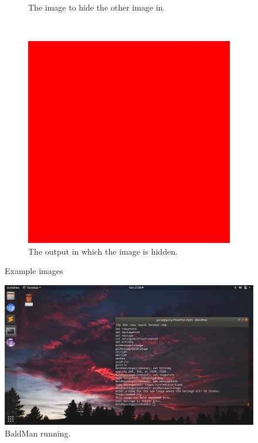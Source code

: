\documentclass[12pt]{article}
\begin{document}
\begin{figure}[h]
\begin{subfigure}[t]{0.3\textwidth}
			\caption{The image to hide the other image in.}
		\end{subfigure}
		~
		\begin{subfigure}[t]{0.3\textwidth}
			\includegraphics[width=\textwidth]{image/newRed.png}
			\caption{The output in which the image is hidden.}
		\end{subfigure}
		\caption{Example images}
	\end{figure}
	
	\begin{figure}[h]
		\centering
		\includegraphics[keepaspectratio=true, width=0.8\linewidth]{screenshot.png}
		\caption{BaldMan running.}
	\end{figure}
	
\end{document}
